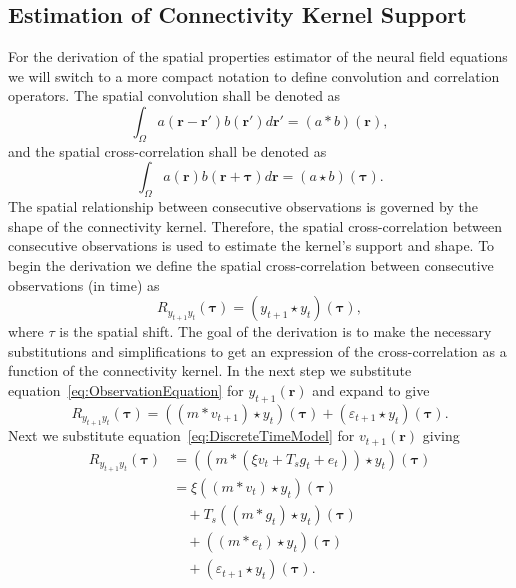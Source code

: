 \documentclass[conference,onecolumn]{IEEEtran}
\begin{document}
\subsection{Estimation of Connectivity Kernel Support}
For the derivation of the spatial properties estimator of the neural field equations we will switch to a more compact notation to define convolution and correlation operators. The spatial convolution shall be denoted as
\begin{equation}
	\int_\Omega a(\mathbf{r}-\mathbf{r}')b(\mathbf{r}')d\mathbf{r}' = (a\ast b)(\mathbf{r}),
\end{equation}
and the spatial cross-correlation shall be denoted as 
\begin{equation}
	\int_\Omega a(\mathbf{r})b(\mathbf{r}+\boldsymbol{\tau})d\mathbf{r} = (a\star b)(\boldsymbol{\tau}).
\end{equation} 
The spatial relationship between consecutive observations is governed by the shape of the connectivity kernel. Therefore, the spatial cross-correlation between consecutive observations is used to estimate the kernel's support and shape. To begin the derivation we define the spatial cross-correlation between consecutive observations (in time) as
\begin{equation}
	R_{y_{t+1}y_t}(\boldsymbol{\tau}) = \left(y_{t+1}\star y_t\right)\left(\boldsymbol{\tau}\right),
\end{equation}
where $\tau$ is the spatial shift. The goal of the derivation is to make the necessary substitutions and simplifications to get an expression of the cross-correlation as a function of the connectivity kernel. In the next step we substitute equation~\ref{eq:ObservationEquation} for $y_{t+1}(\mathbf{r})$ and expand to give
\begin{equation}
	R_{y_{t+1}y_t}\left(\boldsymbol{\tau}\right) = \left(\left(m \ast v_{t+1}\right)\star y_t\right)\left(\boldsymbol{\tau}\right) + \left(\varepsilon_{t+1} \star y_t\right)\left(\boldsymbol{\tau}\right).
\end{equation}
Next we substitute equation~\ref{eq:DiscreteTimeModel} for $v_{t+1}(\mathbf{r})$ giving 
\begin{align}
	R_{y_{t+1}y_t}(\boldsymbol{\tau}) &= (\left(m \ast \left(\xi v_t +  T_s g_t + e_t\right)\right) \star y_t)(\boldsymbol{\tau})\\
	&= \xi\left(\left(m \ast v_t\right) \star y_t \right)(\boldsymbol{\tau}) \nonumber\\
	&\quad+ T_s \left(\left(m\ast g_t\right)\star y_t \right)(\boldsymbol{\tau}) \nonumber\\
	&\quad+ \left(\left(m\ast e_t\right)\star y_t \right)(\boldsymbol{\tau}) \nonumber\\
	&\quad+ (\varepsilon_{t+1} \star y_t)(\boldsymbol{\tau}).
\end{align}
\end{document}
